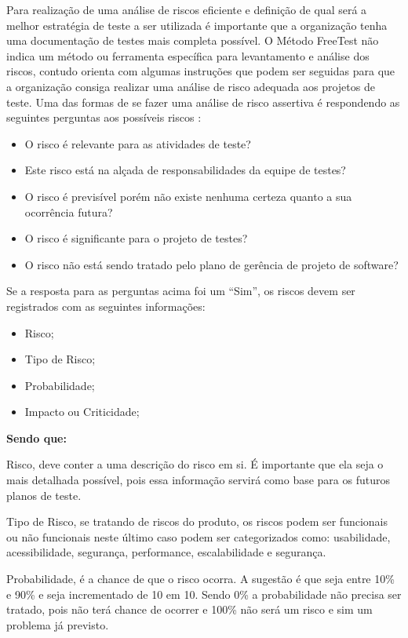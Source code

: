 Para realização de uma análise de riscos eficiente e definição de qual será a melhor estratégia de teste a ser utilizada é importante que a organização tenha uma documentação de testes mais completa possível. O Método FreeTest não indica um método ou ferramenta específica para levantamento e análise dos riscos, contudo orienta com algumas instruções que podem ser seguidas para que a organização consiga realizar uma análise de risco adequada aos projetos de teste. Uma das formas de se fazer uma análise de risco assertiva é respondendo as seguintes perguntas aos possíveis riscos \cite{Rios}:

\begin{itemize}
\item O risco é relevante para as atividades de teste?
\item Este risco está na alçada de responsabilidades da equipe de testes?
\item O risco é previsível porém não existe nenhuma certeza quanto a sua ocorrência futura?
\item O risco é significante para o projeto de testes?
\item O risco não está sendo tratado pelo plano de gerência de projeto de software?
\end{itemize}

Se a resposta para as perguntas acima foi um “Sim”, os riscos devem ser registrados com as seguintes informações:

\begin{itemize}
\item Risco;
\item Tipo de Risco;
\item Probabilidade;
\item Impacto ou Criticidade;
\end{itemize}

\textbf{Sendo que:}

Risco, deve conter a uma descrição do risco em si. É importante que ela seja o mais detalhada possível, pois essa informação servirá como base para os futuros planos de teste.

Tipo de Risco, se tratando de riscos do produto, os riscos podem ser funcionais ou não funcionais neste último caso podem ser categorizados como: usabilidade, acessibilidade, segurança, performance, escalabilidade e segurança.

Probabilidade, é a chance de que o risco ocorra. A sugestão é que seja entre 10\% e 90\% e seja incrementado de 10 em 10. Sendo 0\% a probabilidade não precisa ser tratado, pois não terá chance de ocorrer e 100\% não será um risco e sim um problema já previsto.

